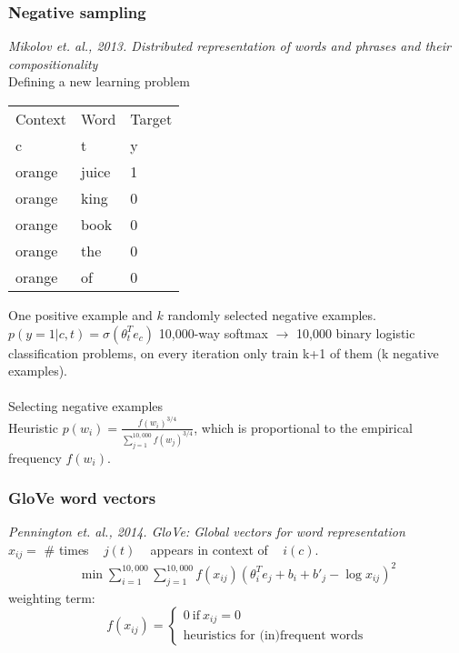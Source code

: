 \subsubsection{Negative sampling}
\textit{Mikolov et. al., 2013. Distributed representation of words and phrases and their compositionality}\\
Defining a new learning problem\\
\begin{center}
\begin{tabular}{ m{2cm} m{2cm} m{2cm}}
Context & Word & Target\\
c & t & y\\
\hline
orange & juice & 1\\
orange & king  & 0\\
orange & book & 0\\
orange & the    & 0\\
orange & of      & 0\\
\end{tabular}
\end{center}
One positive example and $k$ randomly selected negative examples.
$\displaystyle p(y = 1 | c, t) = \sigma (\theta_t^T e_c)$
10,000-way softmax $\rightarrow$ 10,000 binary logistic classification problems, on every iteration only train k+1 of them (k negative examples).\\
\\
Selecting negative examples\\
Heuristic $\displaystyle p(w_i) = \frac{f(w_i)^{3/4}}{\sum_{j = 1}^{10,000} f(w_j)^{3/4}}$, which is proportional to the empirical frequency $f(w_i)$.

\subsubsection{GloVe word vectors}
\textit{Pennington et. al., 2014. GloVe: Global vectors for word representation}\\
$x_{ij} = $ \# times ~ $j (t)$ ~ appears in context of ~ $i(c)$.
\begin{align}
\displaystyle \min \sum_{i =1}^{10,000} \sum_{j =1}^{10,000} f(x_{ij})(\theta_i^T e_j + b_i + b'_j- \log x_{ij})^2
\end{align}
weighting term:
\begin{equation*}
f(x_{ij})  = \left\{ 
    \begin{array}{l}
    0 ~ \text{if} ~ x_{ij} = 0\\
    \text{heuristics for (in)frequent words}
    \end{array} \right.
\end{equation*}


